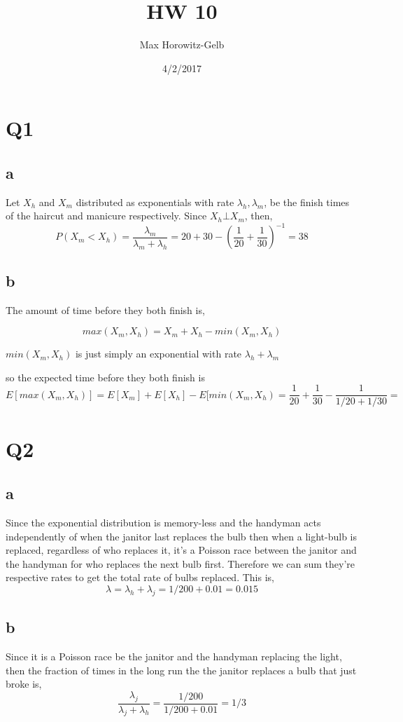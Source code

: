 \documentclass{article}
\title{HW 10}
\author{Max Horowitz-Gelb}
\date{4/2/2017}
\begin{document}
\maketitle

\section*{Q1}
\subsection*{a}
Let $X_h$ and $X_m$ distributed as exponentials with rate $\lambda_h, \lambda_m$, be the finish times  of the haircut and manicure respectively. 
Since $X_h \bot X_m$, then,
$$
P(X_m < X_h) = \frac{\lambda_m}{\lambda_m + \lambda_h} = 20 + 30 - (\frac{1}{20} + \frac{1}{30})^{-1} =  38
$$

\subsection*{b}
The amount of time before they both finish is,

$$
max(X_m,X_h) = X_m + X_h - min(X_m,X_h)
$$

$min(X_m, X_h)$ is just simply an exponential with rate $\lambda_h + \lambda_m$

so the expected time before they both finish is
$$
E[max(X_m, X_h)] = E[X_m] + E[X_h] - E[min(X_m, X_h) = \frac{1}{20} + \frac{1}{30} - \frac{1}{1/20 + 1/30} = 
$$

\section*{Q2}
\subsection*{a}
Since the exponential distribution is memory-less and the handyman acts independently of when the janitor last replaces the bulb then when a light-bulb is replaced, regardless of who replaces it, it's a Poisson race between the janitor and the handyman for who replaces the next bulb first. Therefore we can sum they're respective rates to get the total rate of bulbs replaced. 
This is,
$$
\lambda = \lambda_h + \lambda_j = 1/200 + 0.01 = 0.015
$$

\subsection*{b}
Since it is a Poisson race be the janitor and the handyman replacing the light, then the fraction of times in the long run the the janitor replaces a bulb that just broke is,
$$
\frac{\lambda_j}{\lambda_j + \lambda_h} = \frac{1/200}{1/200 + 0.01} = 1/3
$$
\end{document}
